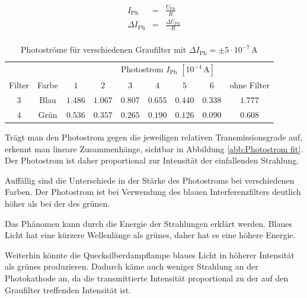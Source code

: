 \documentclass[12pt,a4paper]{scrartcl}
\numberwithin{equation}{section} %
\begin{document}
\begin{eqnarray}
	I_\mathrm{Ph} &=& \frac{U_\mathrm{Ph}}{R} \\
	\Delta I_\mathrm{Ph} &=& \frac{\Delta U_\mathrm{Ph}}{R}\\
\end{eqnarray}

\begin{table}[h!]
	\centering
	\begin{tabular}{c|c|c|c|c|c|c|c|c}
		&& \multicolumn{7}{c}{Photostrom $I_\mathrm{Ph}$ $[10^{-4}\mathrm{\,A}]$} \\
		Filter & Farbe & $1$ & $2$ & $3$ & $4$ & $5$ & $6$ & ohne Filter\\
		\hline
		$3$ & Blau & $1.486$ & $1.067$ & $0.807$ & $0.655$ & $0.440$ & $0.338$ & $1.777$ \\
		$4$ & Grün & $0.536$ & $0.357$ & $0.265$ & $0.190$ & $0.126$ & $0.090$ & $0.608$
	\end{tabular}
	\caption{Photoströme für verschiedenen Graufilter mit $\Delta I_\mathrm{Ph} = \pm 5 \cdot 10^{-7} \mathrm{\,A}$}
	\label{tab:Photostrom Ergebnisse}
\end{table}

\noindent
Trägt man den Photostrom gegen die jeweiligen relativen Transmissionsgrade auf, erkennt man lineare Zusammenhänge, sichtbar in Abbildung \ref{abb:Photostrom fit}. Der Photostrom ist daher proportional zur Intensität der einfallenden Strahlung.

Auffällig sind die Unterschiede in der Stärke des Photostroms bei verschiedenen Farben. Der Photostrom ist bei Verwendung des blauen Interferenzfilters deutlich höher als bei der des grünen.

Das Phänomen kann durch die Energie der Strahlungen erklärt werden. Blaues Licht hat eine kürzere Wellenlänge als grünes, daher hat es eine höhere Energie.

Weiterhin könnte die Quecksilberdampflampe blaues Licht in höherer Intensität als grünes produzieren. Dadurch käme auch weniger Strahlung an der Photokathode an, da die transmittierte Intensität proportional zu der auf den Graufilter treffenden Intensität ist.
\end{document}
